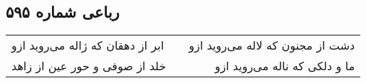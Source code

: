 \begin{center}
\section*{رباعی شماره ۵۹۵}
\label{sec:sh595}
\begin{longtable}{l p{0.5cm} r}
ابر از دهقان که ژاله می‌روید ازو
&&
دشت از مجنون که لاله می‌روید ازو
\\
خلد از صوفی و حور عین از زاهد
&&
ما و دلکی که ناله می‌روید ازو
\\
\end{longtable}
\end{center}
